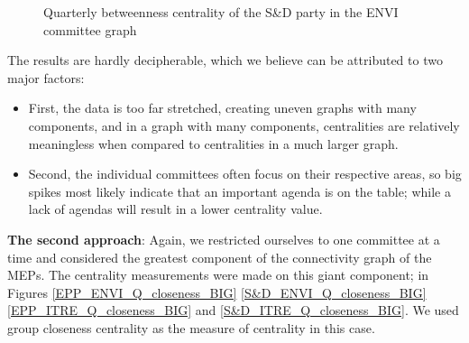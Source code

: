 \documentclass[lettersize,journal]{IEEEtran}
\begin{document}
\begin{figure}[h]
\begin{minipage}[b]{0.23\textwidth}
    \caption{Quarterly betweenness centrality of the S\&D party in the ENVI committee graph}
    \label{fig:btw_S&D}
  \end{minipage}

\end{figure}

The results are hardly decipherable, which we believe can be attributed to two major factors: 
\begin{itemize}
\item First, the data is too far stretched, creating uneven graphs with many components, and in a graph with many components, centralities are relatively meaningless when compared to centralities in a much larger graph.
\item Second, the individual committees often focus on their respective areas, so big spikes most likely indicate that an important agenda is on the table; while a lack of agendas will result in a lower centrality value.
\end{itemize}

\textbf{The second approach}: Again, we restricted ourselves to one committee at a time and considered the greatest component of the connectivity graph of the MEPs. The centrality measurements were made on this giant component; in Figures \ref{EPP_ENVI_Q_closeness_BIG} \ref{S&D_ENVI_Q_closeness_BIG} \ref{EPP_ITRE_Q_closeness_BIG} and \ref{S&D_ITRE_Q_closeness_BIG}. We used group closeness centrality as the measure of centrality in this case.
\end{document}
